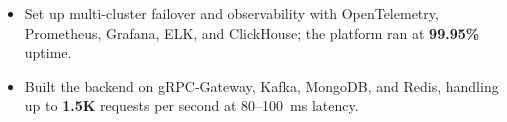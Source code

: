 
\projDattingQ
\begin{itemize}
    \item Set up multi-cluster failover and observability with OpenTelemetry, Prometheus, Grafana, ELK, and ClickHouse; the platform ran at \textbf{99.95\%} uptime. %
    \item Built the backend on gRPC-Gateway, Kafka, MongoDB, and Redis, handling up to \textbf{1.5K} requests per second at 80--100~ms latency. %
\end{itemize}

\cveducation



